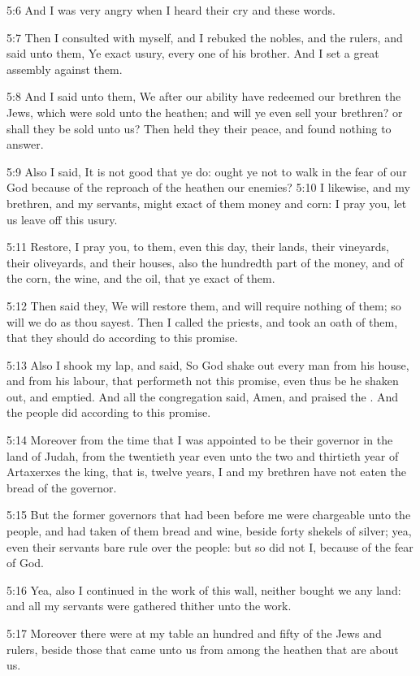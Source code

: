5:6 And I was very angry when I heard their cry and these words.

5:7 Then I consulted with myself, and I rebuked the nobles, and the rulers, and said unto them, Ye exact usury, every one of his brother.  And I set a great assembly against them.

5:8 And I said unto them, We after our ability have redeemed our brethren the Jews, which were sold unto the heathen; and will ye even sell your brethren? or shall they be sold unto us? Then held they their peace, and found nothing to answer.

5:9 Also I said, It is not good that ye do: ought ye not to walk in the fear of our God because of the reproach of the heathen our enemies?  5:10 I likewise, and my brethren, and my servants, might exact of them money and corn: I pray you, let us leave off this usury.

5:11 Restore, I pray you, to them, even this day, their lands, their vineyards, their oliveyards, and their houses, also the hundredth part of the money, and of the corn, the wine, and the oil, that ye exact of them.

5:12 Then said they, We will restore them, and will require nothing of them; so will we do as thou sayest. Then I called the priests, and took an oath of them, that they should do according to this promise.

5:13 Also I shook my lap, and said, So God shake out every man from his house, and from his labour, that performeth not this promise, even thus be he shaken out, and emptied. And all the congregation said, Amen, and praised the \LORD. And the people did according to this promise.

5:14 Moreover from the time that I was appointed to be their governor in the land of Judah, from the twentieth year even unto the two and thirtieth year of Artaxerxes the king, that is, twelve years, I and my brethren have not eaten the bread of the governor.

5:15 But the former governors that had been before me were chargeable unto the people, and had taken of them bread and wine, beside forty shekels of silver; yea, even their servants bare rule over the people: but so did not I, because of the fear of God.

5:16 Yea, also I continued in the work of this wall, neither bought we any land: and all my servants were gathered thither unto the work.

5:17 Moreover there were at my table an hundred and fifty of the Jews and rulers, beside those that came unto us from among the heathen that are about us.

